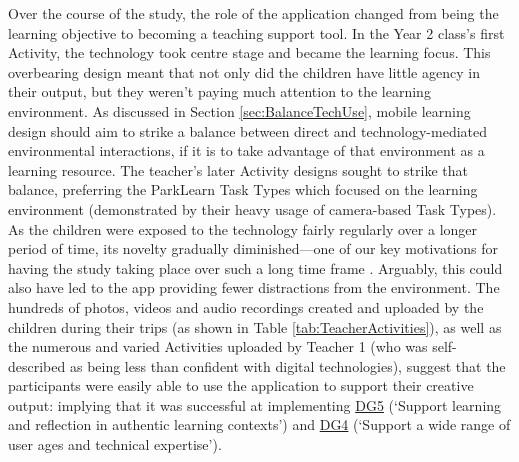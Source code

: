 Over the course of the study, the role of the application changed from being the learning objective to becoming a teaching support tool. In the Year 2 class’s first Activity, the technology took centre stage and became the learning focus. This overbearing design meant that not only did the children have little agency in their output, but they weren't paying much attention to the learning environment. As discussed in Section \ref{sec:BalanceTechUse}, mobile learning design should aim to strike a balance between direct and technology-mediated environmental interactions, if it is to take advantage of that environment as a learning resource. The teacher’s later Activity designs sought to strike that balance, preferring the ParkLearn Task Types which focused on the learning environment (demonstrated by their heavy usage of camera-based Task Types). As the children were exposed to the technology fairly regularly over a longer period of time, its novelty  gradually diminished---one of our key motivations for having the study taking place over such a long time frame \citep{Sharples2013}. Arguably, this could also have led to the app providing fewer distractions from the environment. The hundreds of photos, videos and audio recordings created and uploaded by the children during their trips (as shown in Table \ref{tab:TeacherActivities}), as well as the numerous and varied Activities uploaded by Teacher 1 (who was self-described as being less than confident with digital technologies), suggest that the participants were easily able to use the application to support their creative output: implying that it was successful at implementing \hyperref[DG5]{DG5} (`Support learning and reflection in authentic learning contexts') and \hyperref[DG4]{DG4} (`Support a wide range of user ages and technical expertise').

